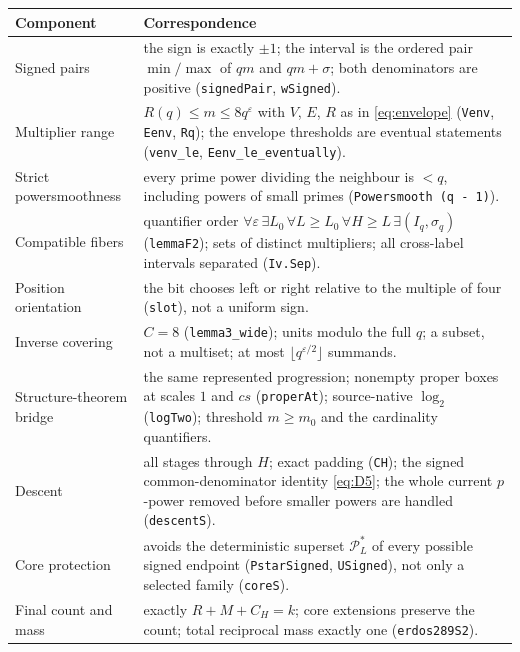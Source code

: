 \documentclass[11pt,letterpaper]{article}
\numberwithin{equation}{section}
\theoremstyle{plain}
\theoremstyle{remark}
\newcommand{\cP}{\mathcal P}
\begin{document}
\begin{center}
\footnotesize
\begin{tabular}{@{}>{\raggedright\arraybackslash}p{3.4cm}>{\raggedright\arraybackslash}p{12.4cm}@{}}
\toprule
Component & Correspondence\\
\midrule
Signed pairs & the sign is exactly $\pm1$; the interval is the ordered pair $\min/\max$ of $qm$ and $qm+\sigma$; both denominators are positive (\texttt{signedPair}, \texttt{wSigned}).\\
Multiplier range & $R(q)\le m\le8q^\varepsilon$ with $V$, $E$, $R$ as in \eqref{eq:envelope} (\texttt{Venv}, \texttt{Eenv}, \texttt{Rq}); the envelope thresholds are eventual statements (\texttt{venv\_le}, \texttt{Eenv\_le\_eventually}).\\
Strict powersmoothness & every prime power dividing the neighbour is $<q$, including powers of small primes (\texttt{Powersmooth (q - 1)}).\\
Compatible fibers & quantifier order $\forall\varepsilon\,\exists L_0\,\forall L\ge L_0\,\forall H\ge L\,\exists(I_q,\sigma_q)$ (\texttt{lemmaF2}); sets of distinct multipliers; all cross-label intervals separated (\texttt{Iv.Sep}).\\
Position orientation & the bit chooses left or right relative to the multiple of four (\texttt{slot}), not a uniform sign.\\
Inverse covering & $C=8$ (\texttt{lemma3\_wide}); units modulo the full $q$; a subset, not a multiset; at most $\lfloor q^{\varepsilon/2}\rfloor$ summands.\\
Structure-theorem bridge & the same represented progression; nonempty proper boxes at scales $1$ and $cs$ (\texttt{properAt}); source-native $\log_2$ (\texttt{logTwo}); threshold $m\ge m_0$ and the cardinality quantifiers.\\
Descent & all stages through $H$; exact padding (\texttt{CH}); the signed common-denominator identity \eqref{eq:D5}; the whole current $p$-power removed before smaller powers are handled (\texttt{descentS}).\\
Core protection & avoids the deterministic superset $\cP^*_L$ of every possible signed endpoint (\texttt{PstarSigned}, \texttt{USigned}), not only a selected family (\texttt{coreS}).\\
Final count and mass & exactly $R+M+C_H=k$; core extensions preserve the count; total reciprocal mass exactly one (\texttt{erdos289S2}).\\
\bottomrule
\end{tabular}
\end{center}
\end{document}
